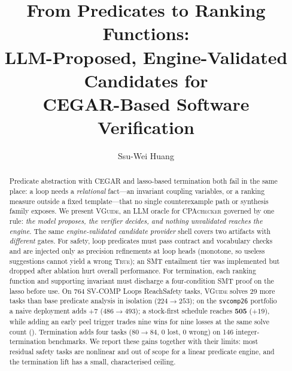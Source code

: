 \documentclass[runningheads]{llncs}
\newcommand{\tool}{\textsc{VGuide}}
\newcommand{\cpa}{\textsc{CPAchecker}}
\begin{document}
\title{From Predicates to Ranking Functions:\\
LLM-Proposed, Engine-Validated Candidates for\\
CEGAR-Based Software Verification}

\author{Ssu-Wei Huang}


\maketitle

\begin{abstract}
Predicate abstraction with CEGAR and lasso-based termination both fail in the same place: a
loop needs a \emph{relational} fact---an invariant coupling variables, or a ranking measure
outside a fixed template---that no single counterexample path or synthesis family exposes.
We present \tool{}, an LLM oracle for \cpa{} governed by one rule: \emph{the model proposes,
the verifier decides, and nothing unvalidated reaches the engine}. The same
\emph{engine-validated candidate provider} shell covers two artifacts with \emph{different} gates.
For safety, loop predicates must pass contract and vocabulary checks and are injected only as
precision refinements at loop heads (monotone, so useless suggestions cannot yield a wrong
\textsc{True}); an SMT entailment tier was implemented but dropped after ablation hurt overall
performance. For termination, each ranking function and supporting invariant must discharge a
four-condition SMT proof on the lasso before use. On 764 SV-COMP Loops ReachSafety tasks,
\tool{} solves 29 more tasks than base predicate analysis in isolation ($224{\to}253$); on the
\texttt{svcomp26} portfolio a naive deployment adds $+7$ ($486{\to}493$); a stock-first schedule
reaches \textbf{505} ($+19$), while adding an early peel trigger trades nine wins for nine losses
at the same solve count (). Termination adds four tasks ($80{\to}84$, 0 lost, 0 wrong) on 146
integer-termination benchmarks. We report these gains together with their limits: most
residual safety tasks are nonlinear and out of scope for a linear predicate engine, and the
termination lift has a small, characterised ceiling.

\end{abstract}
\end{document}
